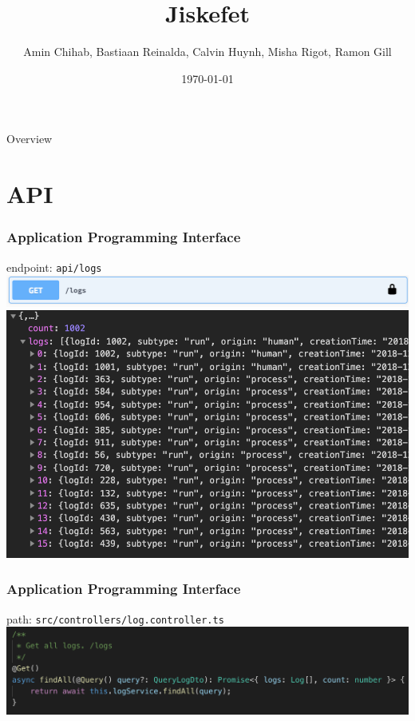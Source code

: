\documentclass[12pt]{beamer}
\title{Jiskefet}
\author{Amin Chihab, Bastiaan Reinalda, Calvin Huynh, Misha Rigot, Ramon Gill}
\date{\today}
\begin{document}
	\begin{frame}
	\titlepage
	\end{frame}

	\begin{frame}{Overview}
		\tableofcontents
	\end{frame}

	
	\section{API}
	\begin{frame}
	    \frametitle{Application Programming Interface}
		endpoint: \texttt{api/logs}
   		\includegraphics[scale=.40]{assets/logs.png}
		\includegraphics[scale=.45]{assets/logs_get_all_json.png}
    \end{frame}

	\begin{frame}
		\frametitle{Application Programming Interface}
		path: \texttt{src/controllers/log.controller.ts}
		\includegraphics[scale=.45]{assets/logs_controller.png}
	\end{frame}
\end{document}
